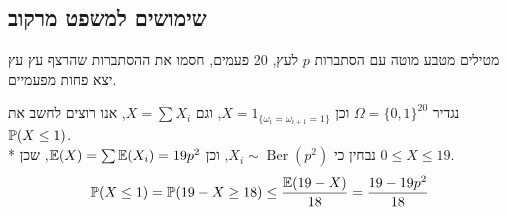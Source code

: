 \subsection{שימושים למשפט מרקוב}
\begin{exercise}
	מטילים מטבע מוטה עם הסתברות $p$ לעץ, 20 פעמים,
	חסמו את ההסתברות שהרצף עץ עץ יצא פחות מפעמיים.
\end{exercise}
\begin{solution}
	נגדיר $\Omega = {\{0, 1\}}^{20}$ וכן $X = 1_{\{\omega_i = \omega_{i + 1} = 1\}}$, וגם $X = \sum X_i$, אנו רוצים לחשב את $\mathbb{P}(X \le 1)$. \\*
	נבחין כי $X_i \sim \operatorname{Ber}(p^2)$, וכן $\mathbb{E}(X) = \sum \mathbb{E}(X_i)  = 19 p^2$, שכן $0 \le X \le 19$.
	\[
		\mathbb{P}(X \le 1)
		= \mathbb{P}(19 - X \ge 18)
		\le \frac{\mathbb{E}(19 - X)}{18}
		= \frac{19 - 19p^2}{18}
	\]
\end{solution}

